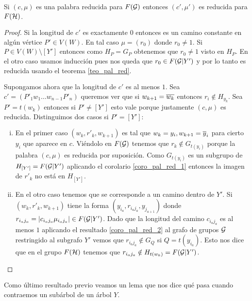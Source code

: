 \documentclass[tesis.tex]{subfiles}
\newcommand{\cG}{ {\cal G} }
\newcommand{\cH}{ {\cal H} }
\begin{document}
\begin{prop}\label{lema_pal_red_iso}
	Si $(c, \mu)$ es una palabra reducida para $F(\cG)$ entonces $(c', \mu')$ es reducida para $F(\cH)$.
\end{prop}
\begin{proof}
	Si la longitud de $c'$ es exactamente $0$ entonces es un camino constante en algún vértice $P' \in V(W)$. 
	En tal caso $\mu = (r_0)$ donde $r_0 \neq 1$.
	Si $P \in V(W) \setminus [Y']$ entonces como $H_P = G_P$ obtenemos que $r_0 \neq 1$ visto en $H_P$.
	En el otro caso usamos inducción pues nos queda que $r_0 \in F(\cG | Y')$ y por lo tanto es reducida usando el teorema \ref{teo_pal_red}.
	
	Supongamos ahora que la longitud de $c'$ es al menos $1$.
	Sea $c' = (P'_1w_1 \dots w_{n-1}P'_n)$ queremos ver que si $w_{k+1} = \overline{w_k}$ entonces $r_i \notin H_{y_k}$.	
	Sea $P' = t(w_k)$ entonces si $P' \neq [Y']$ esto vale porque justamente $(c, \mu)$ es reducida.
	Distinguimos dos casos si $P' = [Y']$:
	\begin{enumerate}[i)]
		\item En el primer caso $(w_{k},r'_k,w_{k+1})$ es tal que $w_{k} = y_i, w_{k+1} = \overline y_i$ para cierto $y_i$ que aparece en $c$. 
		Viéndolo en $F(\cG)$ tenemos que $r_k \notin G_{t(y_i)}$ porque la palabra $(c, \mu)$ es reducida por suposición.
		Como $G_{t(y_i)}$ es un subgrupo de $H_{[Y']} = F(\cG | Y')$ aplicando el corolario \ref{coro_pal_red_1} entonces la imagen de $r'_k$ no está en $H_{[Y']}$.
		
		\item En el otro caso tenemos que se corresponde a un camino dentro de $Y'$.
		Si $(w_{k},r'_k,w_{k+1})$ tiene la forma $(y_{i_a},r_{i_aj_a},y_{j_{a+1}})$ donde $r_{i_aj_a} = |c_{i_aj_a} \mu_{i_aj_a} | \in F(\cG | Y')$. 
		Dado que la longitud del camino $c_{i_aj_a}$ es al menos $1$ aplicando el resultado \ref{coro_pal_red_2} al grafo de grupos $\cG$ restringido al subgrafo $Y'$ vemos que $r_{i_aj_a} \notin G_Q$ si $Q =t(y_{i_a})$.
		Esto nos dice que en el grupo $F(\cH)$ tenemos que $r_{i_aj_a} \notin H_{t(w_k)} = F(\cG | Y')$.
	\end{enumerate}	
\end{proof}

Como último resultado previo veamos un lema que nos dice qué pasa cuando contraemos un subárbol de un árbol $Y$.
\end{document}
